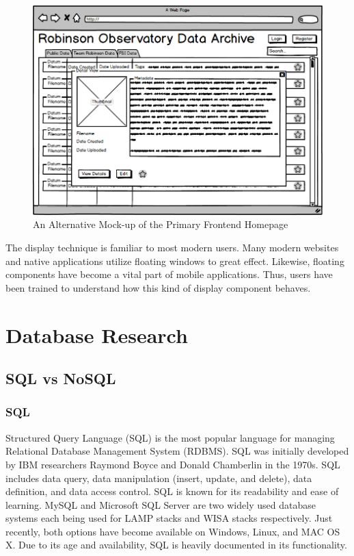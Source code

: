 \documentclass[12pt]{report}
\begin{document}
\begin{figure}[h]
	\centering
	\includegraphics[width=\linewidth]{frontend_floating}
	\caption{An Alternative Mock-up of the Primary Frontend Homepage}
	\label{fig:frontendfloating}
\end{figure}

The display technique is familiar to most modern users. Many modern websites and native applications utilize floating windows to great effect. Likewise, floating components have become a vital part of mobile applications. Thus, users have been trained to understand how this kind of display component behaves.

\section*{Database Research}

\subsection*{SQL vs NoSQL}

\subsubsection*{SQL}

Structured Query Language (SQL) is the most popular language for managing Relational Database Management System (RDBMS).  SQL was initially developed by IBM researchers Raymond Boyce and Donald Chamberlin in the 1970s.  SQL includes data query, data manipulation (insert, update, and delete), data definition, and data access control.  SQL is known for its readability and ease of learning.  MySQL and Microsoft SQL Server are two widely used database systems each being used for LAMP stacks and WISA stacks respectively.  Just recently, both options have become available on Windows, Linux, and MAC OS X.  Due to its age and availability, SQL is heavily documented in its functionality.
\end{document}
